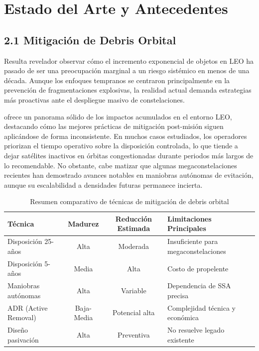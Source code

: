 \section{Estado del Arte y Antecedentes}

\subsection{2.1 Mitigación de Debris Orbital}

Resulta revelador observar cómo el incremento exponencial de objetos en LEO ha pasado de ser una preocupación marginal a un riesgo sistémico en menos de una década. Aunque los enfoques tempranos se centraron principalmente en la prevención de fragmentaciones explosivas, la realidad actual demanda estrategias más proactivas ante el despliegue masivo de constelaciones.

\cite{Ailor2022} ofrece un panorama sólido de los impactos acumulados en el entorno LEO, destacando cómo las mejores prácticas de mitigación post-misión siguen aplicándose de forma inconsistente. En muchos casos estudiados, los operadores priorizan el tiempo operativo sobre la disposición controlada, lo que tiende a dejar satélites inactivos en órbitas congestionadas durante periodos más largos de lo recomendable. No obstante, cabe matizar que algunas megaconstelaciones recientes han demostrado avances notables en maniobras autónomas de evitación, aunque su escalabilidad a densidades futuras permanece incierta.

\begin{table}[t]
\centering
\caption{Resumen comparativo de técnicas de mitigación de debris orbital}
\label{tab:tecnicas_mitigacion}
\begin{tabular}{lccp{5cm}}
\hline
Técnica & Madurez & Reducción Estimada & Limitaciones Principales \\
\hline
Disposición 25-años & Alta & Moderada & Insuficiente para megaconstelaciones \\
Disposición 5-años & Media & Alta & Costo de propelente \\
Maniobras autónomas & Alta & Variable & Dependencia de SSA precisa \\
ADR (Active Removal) & Baja-Media & Potencial alta & Complejidad técnica y económica \\
Diseño pasivación & Alta & Preventiva & No resuelve legado existente \\
\hline
\end{tabular}
\end{table}

